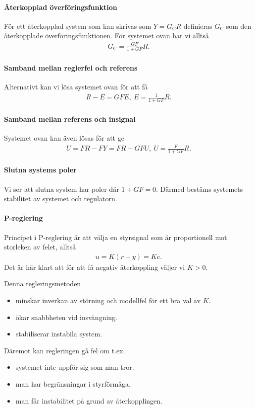 \paragraph{Återkopplad överföringsfunktion}
För ett återkopplad system som kan skrivas som $Y = G_{\text{C}}R$ definieras $G_{\text{C}}$ som den återkopplade överföringsfunktionen. För systemet ovan har vi alltså
\begin{align*}
	G_{\text{C}} = \frac{GF}{1 + GF}R.
\end{align*}

\paragraph{Samband mellan reglerfel och referens}
Alternativt kan vi lösa systemet ovan för att få
\begin{align*}
	R - E = GFE,\ E = \frac{1}{1 + GF}R.
\end{align*}

\paragraph{Samband mellan referens och insignal}
Systemet ovan kan även lösas för att ge
\begin{align*}
	U = FR - FY = FR - GFU,\ U = \frac{F}{1  + GF}R.
\end{align*}

\paragraph{Slutna systems poler}
Vi ser att slutna system har poler där $1 + GF = 0$. Därmed bestäms systemets stabilitet av systemet och regulatorn.

\paragraph{P-reglering}
Principet i P-reglering är att välja en styrsignal som är proportionell mot storleken av felet, alltså
\begin{align*}
	u = K(r - y) = Ke.
\end{align*}
Det är här klart att för att få negativ återkoppling väljer vi $K > 0$.

Denna regleringsmetoden
\begin{itemize}
	\item minskar inverkan av störning och modellfel för ett bra val av $K$.
	\item ökar snabbheten vid insvängning.
	\item stabiliserar instabila system.
\end{itemize}
Däremot kan regleringen gå fel om t.ex.
\begin{itemize}
	\item systemet inte uppför sig som man tror.
	\item man har begränsningar i styrförmåga.
	\item man får instabilitet på grund av återkopplingen.
\end{itemize}

